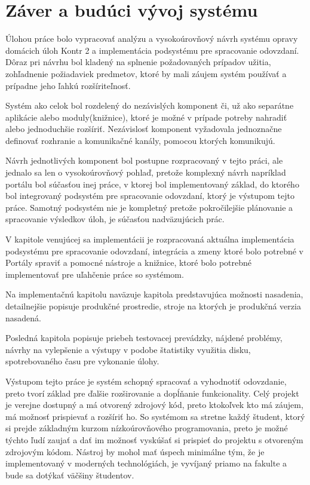 \documentclass[
  digital, %
  twoside, %
  table,   %
  lof,     %
  lot,     %
]{fithesis3}
\begin{document}
\chapter{Záver a budúci vývoj systému}

Úlohou práce bolo vypracovať analýzu a vysokoúrovňový návrh systému opravy domácich úloh Kontr 2 a implementácia podsystému pre spracovanie odovzdaní. 
Dôraz pri návrhu bol kladený na splnenie požadovaných prípadov užitia, zohľadnenie požiadaviek predmetov, ktoré by mali záujem systém používať a prípadne jeho ľahkú rozšíriteľnosť.

Systém ako celok bol rozdelený do nezávislých komponent či, už ako separátne aplikácie alebo moduly(knižnice), ktoré je možné v prípade potreby nahradiť alebo jednoduchšie rozšíriť. Nezávislosť komponent vyžadovala jednoznačne definovať rozhranie a komunikačné kanály, pomocou ktorých komunikujú.

Návrh jednotlivých komponent bol postupne rozpracovaný v tejto práci, ale jednalo sa len o vysokoúrovňový pohlaď, pretože komplexný návrh napríklad portálu bol súčasťou inej práce, v ktorej bol implementovaný základ, do ktorého bol integrovaný podsystém pre spracovanie odovzdaní, ktorý je výstupom tejto práce.
Samotný podsystém nie je kompletný pretože pokročilejšie plánovanie a spracovanie výsledkov úloh, je súčasťou nadväzujúcich prác.

V kapitole venujúcej sa implementácii je rozpracovaná aktuálna implementácia podsystému pre spracovanie odovzdaní, integrácia a zmeny ktoré bolo potrebné v Portály spraviť a pomocné nástroje a knižnice, ktoré bolo potrebné implementovať pre uľahčenie práce so systémom.

Na implementačnú kapitolu naväzuje kapitola predstavujúca možnosti nasadenia, detailnejšie popisuje produkčné prostredie, stroje na ktorých je produkčná verzia nasadená. 

Posledná kapitola popisuje priebeh testovacej prevádzky, nájdené problémy, návrhy na vylepšenie a výstupy v podobe štatistiky využitia disku, spotrebovaného času pre vykonanie úlohy.

Výstupom tejto práce je systém schopný spracovať a vyhodnotiť odovzdanie, preto tvorí základ pre ďalšie rozširovanie a dopĺňanie funkcionality. Celý projekt je verejne dostupný a má otvorený zdrojový kód, preto ktokoľvek kto má záujem, má možnosť prispievať a rozšíriť ho. So systémom sa stretne každý študent, ktorý si prejde základným kurzom nízkoúrovňového programovania, preto je možné týchto ľudí zaujať a dať im možnosť vyskúšať si prispieť do projektu s otvoreným zdrojovým kódom. 
Nástroj by mohol mať úspech minimálne tým, že je implementovaný v moderných technológiách, je vyvíjaný priamo na fakulte a bude sa dotýkať väčšiny študentov.
\end{document}
